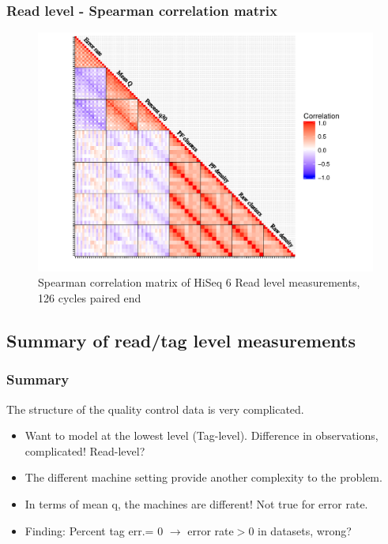 \documentclass[10pt]{beamer}\usepackage[]{graphicx}\usepackage[]{color}
\makeatletter
\def\maxwidth{ %
  \ifdim\Gin@nat@width>\linewidth
    \linewidth
  \else
    \Gin@nat@width
  \fi
}
\newenvironment{knitrout}{}{} %
\makeatother
\begin{document}
\begin{frame}\frametitle{Read level - Spearman correlation matrix}
\begin{knitrout}
\color{fgcolor}\begin{figure}
\includegraphics[width=\maxwidth]{figure/ReadlvlCor-1} \caption[Spearman correlation matrix of HiSeq 6 Read level measurements, 126 cycles paired end]{Spearman correlation matrix of HiSeq 6 Read level measurements, 126 cycles paired end}\label{fig:ReadlvlCor}
\end{figure}


\end{knitrout}
\end{frame}
\subsection{Summary of read/tag level measurements}
\begin{frame}\frametitle{Summary}
The structure of the quality control data is very complicated.
\begin{itemize}
\item Want to model at the lowest level (Tag-level). Difference in observations, complicated! Read-level? 
\item The different machine setting provide another complexity to the problem.
\item In terms of mean q, the machines are different! Not true for error rate. 
\item Finding: Percent tag err.= 0 $\rightarrow$ error rate$>0$ in datasets, wrong? 
\end{itemize}
\end{frame}
\end{document}
